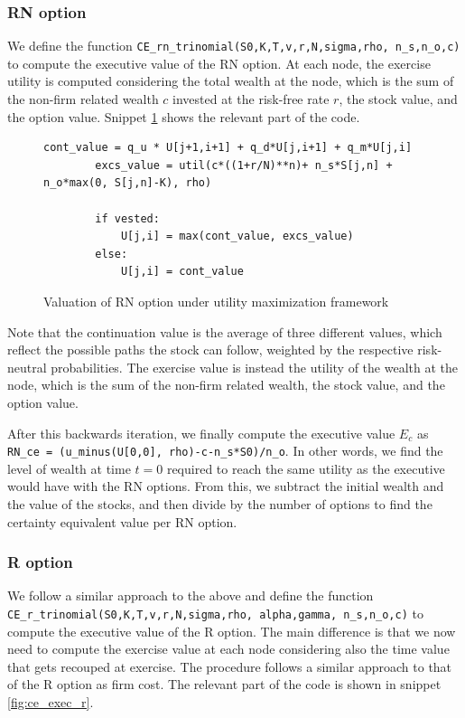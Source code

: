\subsubsection{RN option}
We define the function \verb|CE_rn_trinomial(S0,K,T,v,r,N,sigma,rho, n_s,n_o,c)| to compute the executive value of the RN option. At each node, the exercise utility is computed considering the total wealth at the node, which is the sum of the non-firm related wealth $c$ invested at the risk-free rate $r$, the stock value, and the option value. Snippet \ref*{fig:ce_exec_rn} shows the relevant part of the code.

\begin{figure}[H]
    \begin{lstlisting}[breaklines, basicstyle=\ttfamily\small]
        cont_value = q_u * U[j+1,i+1] + q_d*U[j,i+1] + q_m*U[j,i]
        excs_value = util(c*((1+r/N)**n)+ n_s*S[j,n] + n_o*max(0, S[j,n]-K), rho)
        
        if vested:
            U[j,i] = max(cont_value, excs_value)
        else: 
            U[j,i] = cont_value
    \end{lstlisting}
 \label{fig:ce_exec_rn}
 \caption{Valuation of RN option under utility maximization framework}
\end{figure}

Note that the continuation value is the average of three different values, which reflect the possible paths the stock can follow, weighted by the respective risk-neutral probabilities. The exercise value is instead the utility of the wealth at the node, which is the sum of the non-firm related wealth, the stock value, and the option value. 

After this backwards iteration, we finally compute the executive value $E_c$ as \\
\verb|RN_ce = (u_minus(U[0,0], rho)-c-n_s*S0)/n_o|.
In other words, we find the level of wealth at time $t=0$ required to reach the same utility as the executive would have with the RN options. From this, we subtract the initial wealth and the value of the stocks, and then divide by the number of options to find the certainty equivalent value per RN option.

\subsubsection{R option}
We follow a similar approach to the above and define the function\\
\verb|CE_r_trinomial(S0,K,T,v,r,N,sigma,rho, alpha,gamma, n_s,n_o,c)| to compute the executive value of the R option. The main difference is that we now need to compute the exercise value at each node considering also the time value that gets recouped at exercise. The procedure follows a similar approach to that of the R option as firm cost. The relevant part of the code is shown in snippet \ref*{fig:ce_exec_r}.

